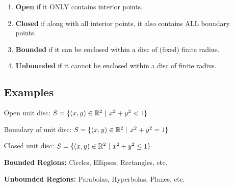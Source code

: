 \begin{enumerate}
    \item \textbf{Open} if it ONLY contains interior points.
    \item \textbf{Closed} if along with all interior points, it also contains ALL boundary points.
    \item \textbf{Bounded} if it can be enclosed within a disc of (fixed) finite radius.
    \item \textbf{Unbounded} if it cannot be enclosed within a disc of finite radius.
\end{enumerate}


\subsection{Examples}

\begin{example}
    \normalfont
    Open unit disc: $S = \{(x, y) \in \R^2\ |\ x^2 + y^2 < 1\}$
\end{example}

\begin{example}
    \normalfont
    Boundary of unit disc: $S = \{(x, y) \in \mathbb{R}^2\ |\ x^2 + y^2 = 1\}$
\end{example}

\begin{example}
    \normalfont
    Closed unit disc: $S = \{(x, y) \in \R^2\ |\ x^2 + y^2 \leq 1\}$
\end{example}

\begin{example}
    \normalfont
    \textbf{Bounded Regions:} Circles, Ellipses, Rectangles, etc.
\end{example}

\begin{example}
    \normalfont
    \textbf{Unbounded Regions:} Parabolas, Hyperbolas, Planes, etc.
\end{example}